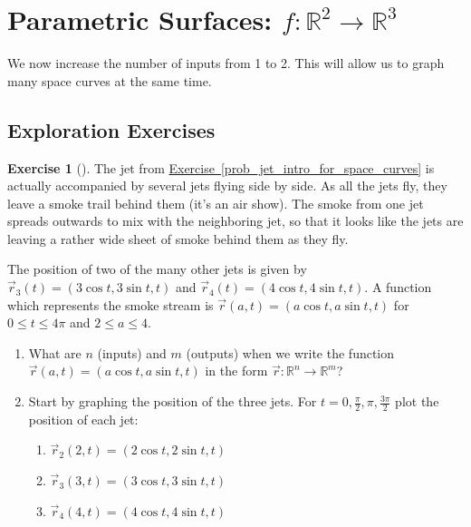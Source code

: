 \documentclass[10pt,]{book}
\theoremstyle{plain}
\theoremstyle{definition}
\theoremstyle{definition}
\theoremstyle{definition}
\theoremstyle{definition}
\newtheorem{exploration}[project]{Exercise}
\theoremstyle{definition}
\numberwithin{equation}{section}
\begin{document}
\section[{Parametric Surfaces: \(f\colon {\mathbb{R}}^2\to {\mathbb{R}}^3 \)}]{Parametric Surfaces: \(f\colon {\mathbb{R}}^2\to {\mathbb{R}}^3 \)}\label{ch06_03_psurfaces}
We now increase the number of inputs from 1 to 2. This will allow us to graph many space curves at the same time.%
\typeout{************************************************}
\typeout{************************************************}
\subsection[{Exploration Exercises}]{Exploration Exercises}\label{subsection-23}
\begin{exploration}[]\label{prob_parametric_surface_example}
The jet from \hyperref[prob_jet_intro_for_space_curves]{Exercise~\ref{prob_jet_intro_for_space_curves}} is actually accompanied by several jets flying side by side. As all the jets fly, they leave a smoke trail behind them (it's an air show). The smoke from one jet spreads outwards to mix with the neighboring jet, so that it looks like the jets are leaving a rather wide sheet of smoke behind them as they fly.%
\par
The position of two of the many other jets is given by \(\vec r_3(t)=(3\cos t, 3\sin t, t)\) and \(\vec r_4(t)=(4\cos t,4\sin t,t)\). A function which represents the smoke stream is \(\vec r(a,t)=(a\cos t, a\sin t, t)\) for \(0\leq t\leq 4\pi\) and \(2\leq a\leq 4\).%
\begin{enumerate}[font=\bfseries,label=(\alph*),ref=\alph*]
\item\label{task-180} What are \(n\) (inputs) and \(m\) (outputs) when we write the function \(\vec r(a,t)=(a\cos t, a\sin t, t)\) in the form  \(\vec r\colon {\mathbb{R}}^n\to {\mathbb{R}}^m\)?%
\item\label{task-181} Start by graphing the position of the three jets. For \(t=0, \frac{\pi}{2}, \pi, \frac{3\pi}{2}\) plot the position of each jet:%
\begin{enumerate}[font=\bfseries,label=(\roman*),ref=\theenumi.\roman*]
\item\label{task-182} \(\vec r_2(2,t)=(2\cos t, 2\sin t, t)\)%
\item\label{task-183} \(\vec r_3(3,t)=(3\cos t, 3\sin t, t)\)%
\item\label{task-184} \(\vec r_4(4,t)=(4\cos t, 4\sin t, t)\)%

\end{enumerate}
\end{enumerate}
\end{exploration}
\end{document}
